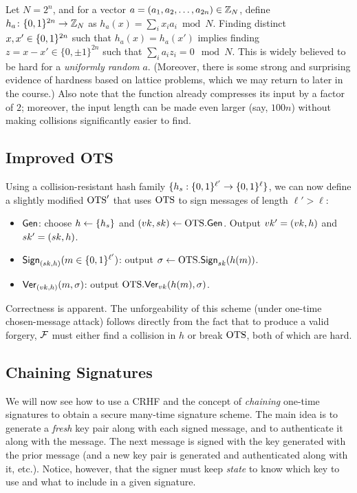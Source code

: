 \documentclass[11pt]{article}
\begin{document}
\begin{example}
  Let $N= 2^{n}$, and for a vector $a=(a_1,a_2,\ldots, a_{2n}) \in
  \mathbb{Z}_N$, define $h_a \colon \{0,1\}^{2n} \to \mathbb{Z}_N$ as $h_a(x) = \sum_i
  x_i a_i \bmod N$.  Finding distinct $x,x' \in \{0,1\}^{2n}$ such that
  $h_{a}(x) = h_{a}(x')$ implies finding $z = x-x' \in \{0, \pm 1
  \}^{2n}$ such that $\sum_i a_i z_i = 0 \mod N$.  This is widely
  believed to be hard for a \emph{uniformly random} $a$.  (Moreover,
  there is some strong and surprising evidence of hardness based on
  lattice problems, which we may return to later in the course.)  Also
  note that the function already compresses its input by a factor of
  $2$; moreover, the input length can be made even larger (say,
  $100n$) without making collisions significantly easier to find.
\end{example}

\subsection{Improved OTS}

Using a collision-resistant hash family $\{h_{s} : \{0,1\}^{\ell'} \to
  \{0,1\}^{\ell}\}$, we can now define a slightly modified $\text{OTS}'$ that
uses $\text{OTS}$ to sign messages of length $\ell' > \ell$:

\begin{itemize}
\item $\mathsf{Gen}$: choose $h \gets \{h_s\}$ and $(vk,sk) \gets
  \text{OTS}.\mathsf{Gen}$.  Output $vk' = (vk, h)$ and $sk' = (sk,h)$.
\item $\mathsf{Sign}_{(sk,h)}(m \in \{0,1\}^{\ell'})$: output $\sigma \gets
  \text{OTS}.\mathsf{Sign}_{sk}(h(m))$.
\item $\mathsf{Ver}_{(vk,h)}(m,\sigma)$: output
  $\text{OTS}.\mathsf{Ver}_{vk}(h(m),\sigma)$.
\end{itemize}

Correctness is apparent.  The unforgeability of this scheme (under
one-time chosen-message attack) follows directly from the fact that to
produce a valid forgery, $\mathcal{F}$ must either find a collision in $h$ or
break $\text{OTS}$, both of which are hard.

\subsection{Chaining Signatures}
\label{sec:chaining-signatures}

We will now see how to use a CRHF and the concept of \emph{chaining}
one-time signatures to obtain a secure many-time signature scheme.
The main idea is to generate a \emph{fresh} key pair along with each
signed message, and to authenticate it along with the message.  The
next message is signed with the key generated with the prior message
(and a new key pair is generated and authenticated along with it,
etc.).  Notice, however, that the signer must keep \emph{state} to
know which key to use and what to include in a given signature.
\end{document}

